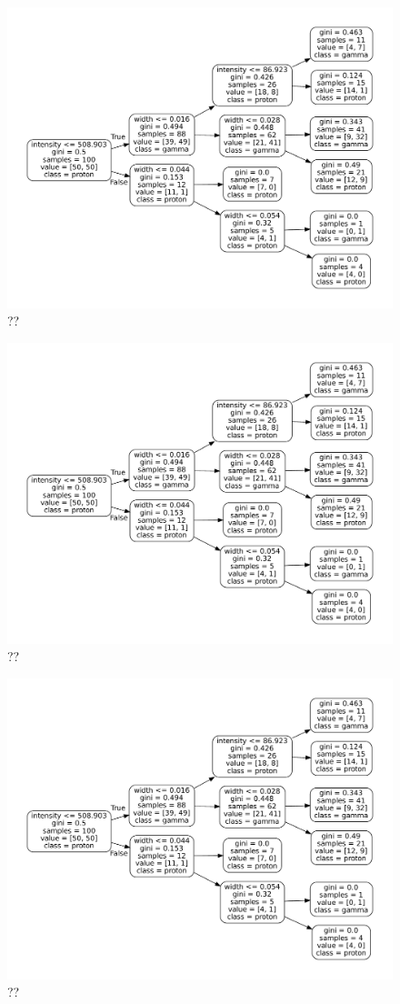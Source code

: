 \begin{figure}
    \includegraphics[width=.8\textwidth]{Plots/decision_tree.pdf}
    \caption{??}
    \label{fig:??}
\end{figure}

\begin{figure}
    \includegraphics[width=.8\textwidth]{Plots/decision_tree.pdf}
    \caption{??}
    \label{fig:??}
\end{figure}

\begin{figure}
    \includegraphics[width=.8\textwidth]{Plots/decision_tree.pdf}
    \caption{??}
    \label{fig:??}
\end{figure}


